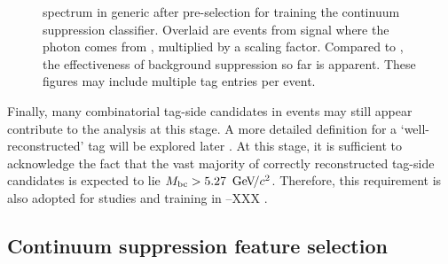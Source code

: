 \begin{figure}[htbp!]
    \centering
    \caption{\label{fig:preselected_photons} \BtoXsgamma spectrum in generic \MC after pre-selection for training the continuum suppression \BDT classifier.
    Overlaid are events from signal \MC where the photon comes from \BtoXsgamma, multiplied by a scaling factor.
    Compared to , the effectiveness of background suppression so far is apparent.
    These figures may include multiple tag entries per event.
    }
\end{figure}

Finally, many combinatorial tag-side candidates in \BB events may still appear contribute to the analysis at this stage.
A more detailed definition for a `well-reconstructed' tag will be explored later 
.
At this stage, it is sufficient to acknowledge the fact that the vast majority of correctly reconstructed tag-side candidates is expected to lie ${M_{\mathrm{bc}}}>5.27~{\mathrm{\,Ge\kern -0.1em V\!/}c^2}$.
Therefore, this requirement is also adopted for studies and training in --XXX
.

\subsection{Continuum suppression feature selection}\label{sec:continuum_features}

